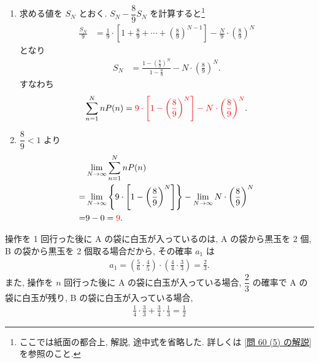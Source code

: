 \begin{qenumerate}
{\begin{enumerate}
{\begin{align}
						\Leftrightarrow\quad& n(\log{8} - \log{9})\leq -\log{2} \\
						\Leftrightarrow\quad& n\geq\frac{\log{2}}{2\log{3} - 3\log{2}} \\
						\Leftrightarrow\quad& n\geq\frac{0.301}{2\cdot 0.477 - 3\cdot 0.301}\simeq 5.902
				\end{align}
				となるから, これを満たす最小の回数は .
			}
			\item{
				求める値を $S_{N}$ とおく.
				$S_{N} - \dfrac{8}{9}S_{N}$ を計算すると\footnote{ここでは紙面の都合上, 解説, 途中式を省略した. 詳しくは \ref{問 60 (5) の解説} を参照のこと.}
				\begin{align}
					\frac{S_{N}}{9} &= \frac{1}{9}\cdot\left[1 + \frac{8}{9} + \cdots + \left(\frac{8}{9}\right)^{N - 1}\right] - \frac{N}{9}\cdot\left(\frac{8}{9}\right)^{N}
				\end{align}
				となり
				\begin{align}
					S_{N} &= \frac{1 - \left(\frac{8}{9}\right)^{N}}{1 - \frac{8}{9}} - N\cdot\left(\frac{8}{9}\right)^{N}.
				\end{align}
				すなわち
				\begin{align}
					\sum_{n = 1}^{N}{nP(n)} = \textcolor{red}{9\cdot\left[1 - \left(\frac{8}{9}\right)^{N}\right] - N\cdot\left(\frac{8}{9}\right)^{N}}.
				\end{align}
			}
			\item{
				$\dfrac{8}{9}<1$ より
				\begin{align}
					&\lim_{N\to\infty}{\sum_{n = 1}^{N}{nP(n)}} \\
						=& \lim_{N\to\infty}{\left\{9\cdot\left[1 - \left(\frac{8}{9}\right)^{N}\right]\right\}} - \lim_{N\to\infty}{N\cdot\left(\frac{8}{9}\right)^{N}} \\
						=& 9 - 0 = \textcolor{red}{9}.
				\end{align}
			}
		\end{enumerate}
	}
	\item{
		操作を 1 回行った後に A の袋に白玉が入っているのは, A の袋から黒玉を 2 個, B の袋から黒玉を 2 個取る場合だから, その確率 $a_{1}$ は
		\begin{align}
			a_{1} = \left(\frac{5}{6}\cdot\frac{4}{5}\right)\cdot\left(\frac{4}{4}\cdot\frac{3}{3}\right) = \frac{2}{3}.
		\end{align}
		また, 操作を $n$ 回行った後に A の袋に白玉が入っている場合, $\dfrac{2}{3}$ の確率で A の袋に白玉が残り, B の袋に白玉が入っている場合, 
		\begin{align}
			\frac{1}{4}\cdot\frac{3}{3} + \frac{3}{4}\cdot\frac{1}{3} = \frac{1}{2}

\end{align}}
\end{qenumerate}
